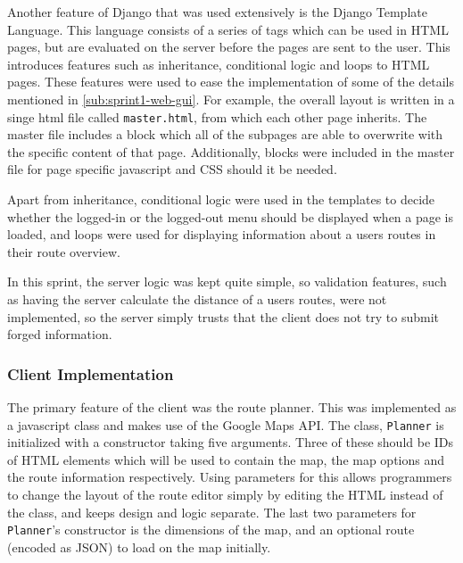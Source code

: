 Another feature of Django that was used extensively is the Django Template Language. This language consists of a series of tags which can be used in \ac{HTML} pages, but are evaluated on the server before the pages are sent to the user. This introduces features such as inheritance, conditional logic and loops to \ac{HTML} pages. These features were used to ease the implementation of some of the details mentioned in \autoref{sub:sprint1-web-gui}. For example, the overall layout is written in a singe html file called \texttt{master.html}, from which each other page inherits. The master file includes a block which all of the subpages are able to overwrite with the specific content of that page. Additionally, blocks were included in the master file for page specific javascript and \ac{CSS} should it be needed.

Apart from inheritance, conditional logic were used in the templates to decide whether the logged-in or the logged-out menu should be displayed when a page is loaded, and loops were used for displaying information about a users routes in their route overview.

In this sprint, the server logic was kept quite simple, so validation features, such as having the server calculate the distance of a users routes, were not implemented, so the server simply trusts that the client does not try to submit forged information.

\subsubsection{Client Implementation}

The primary feature of the client was the route planner. This was implemented as a javascript class and makes use of the Google Maps \ac{API}\cite{gmapsapi}. The class, \texttt{Planner} is initialized with a constructor taking five arguments. Three of these should be IDs of \ac{HTML} elements which will be used to contain the map, the map options and the route information respectively. Using parameters for this allows programmers to change the layout of the route editor simply by editing the \ac{HTML} instead of the class, and keeps design and logic separate. The last two parameters for \texttt{Planner}'s constructor is the dimensions of the map, and an optional route (encoded as \ac{JSON}) to load on the map initially.

